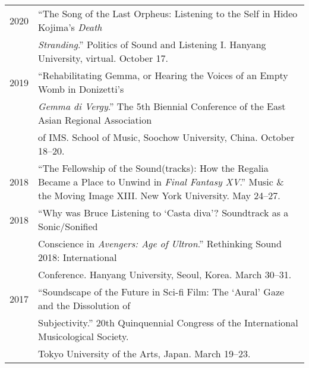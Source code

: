 \documentclass[a4paper,11pt,draft]{article}
\begin{document}
\begin{tabular}{p{2.5cm} p{12.5cm}}
    2020 & “The Song of the Last Orpheus: Listening to the Self in Hideo Kojima’s \textit{Death}\\
    & \textit{Stranding}.” Politics of Sound and Listening I. Hanyang University, virtual. October 17.\\[2mm]
  
    2019 & “Rehabilitating Gemma, or Hearing the Voices of an Empty Womb in Donizetti’s\\
    & \textit{Gemma di Vergy}.” The 5th Biennial Conference of the East Asian Regional Association\\
    & of IMS. School of Music, Soochow University, China. October 18–20.\\[2mm]
  
  
    2018 & “The Fellowship of the Sound(tracks): How the Regalia Became a Place
    to Unwind in \textit{Final Fantasy XV}.” Music \& the Moving Image XIII.
    New York University. May 24--27.\\[2mm]
  
    2018 & “Why was Bruce Listening to ‘Casta diva’? Soundtrack as a
    Sonic/Sonified\\
    & Conscience in \textit{Avengers: Age of Ultron}.” Rethinking Sound 2018:
    International\\
    & Conference. Hanyang University, Seoul, Korea. March 30--31.\\[2mm]
  
  
    2017 & “Soundscape of the Future in Sci-fi Film: The ‘Aural’ Gaze and the
    Dissolution of\\
    & Subjectivity.” 20th Quinquennial Congress of the International
    Musicological Society.\\
    & Tokyo University of the Arts, Japan. March 19--23.\\[2mm]
  


\end{tabular}
\end{document}
